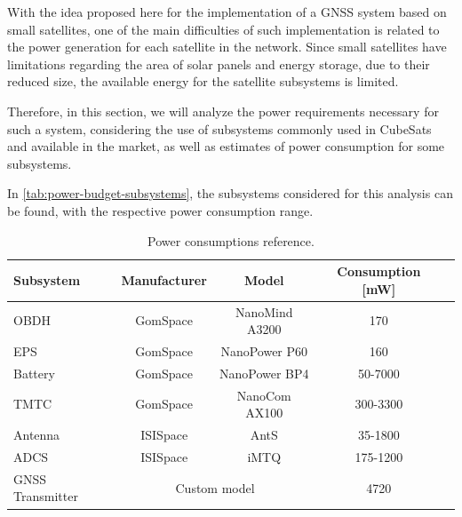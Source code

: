 

With the idea proposed here for the implementation of a GNSS system based on small satellites, one of the main difficulties of such implementation is related to the power generation for each satellite in the network. Since small satellites have limitations regarding the area of solar panels and energy storage, due to their reduced size, the available energy for the satellite subsystems is limited.

Therefore, in this section, we will analyze the power requirements necessary for such a system, considering the use of subsystems commonly used in CubeSats and available in the market, as well as estimates of power consumption for some subsystems.

In \autoref{tab:power-budget-subsystems}, the subsystems considered for this analysis can be found, with the respective power consumption range.

\begin{table}[!ht]
    \centering
    \begin{tabular}{lcccc}
        \toprule[1.5pt]
        \textbf{Subsystem} & \textbf{Manufacturer} & \textbf{Model} & \textbf{Consumption [mW]} \\
        \midrule
        OBDH     & GomSpace & NanoMind A3200 & 170 \\
        EPS      & GomSpace & NanoPower P60  & 160 \\
        Battery  & GomSpace & NanoPower BP4  & 50-7000 \\
        TMTC     & GomSpace & NanoCom AX100  & 300-3300 \\
        Antenna  & ISISpace & AntS           & 35-1800 \\
        ADCS     & ISISpace & iMTQ           & 175-1200 \\
        GNSS Transmitter & \multicolumn{2}{c}{Custom model} & 4720 \\
        \bottomrule[1.5pt]
    \end{tabular}
    \caption{Power consumptions reference.}
    \label{tab:power-budget-subsystems}
\end{table}

